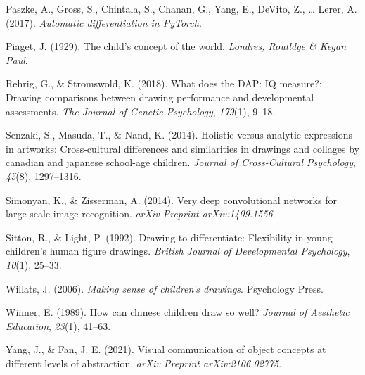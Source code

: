\documentclass[
  man]{apa6}
\newlength{\cslhangindent}
\newlength{\cslentryspacingunit} %
\newenvironment{CSLReferences}[2] %
 {%
  \setlength{\parindent}{0pt}
  \ifodd #1
  \let\oldpar\par
  \def\par{\hangindent=\cslhangindent\oldpar}
  \fi
  \setlength{\parskip}{#2\cslentryspacingunit}
 }%
 {}
\begin{document}
\begin{CSLReferences}{1}{0}
\leavevmode{}%
Paszke, A., Gross, S., Chintala, S., Chanan, G., Yang, E., DeVito, Z., \ldots{} Lerer, A. (2017). \emph{Automatic differentiation in PyTorch}.

\leavevmode{}%
Piaget, J. (1929). The child's concept of the world. \emph{Londres, Routldge \& Kegan Paul}.

\leavevmode{}%
Rehrig, G., \& Stromswold, K. (2018). What does the DAP: IQ measure?: Drawing comparisons between drawing performance and developmental assessments. \emph{The Journal of Genetic Psychology}, \emph{179}(1), 9--18.

\leavevmode{}%
Senzaki, S., Masuda, T., \& Nand, K. (2014). Holistic versus analytic expressions in artworks: Cross-cultural differences and similarities in drawings and collages by canadian and japanese school-age children. \emph{Journal of Cross-Cultural Psychology}, \emph{45}(8), 1297--1316.

\leavevmode{}%
Simonyan, K., \& Zisserman, A. (2014). Very deep convolutional networks for large-scale image recognition. \emph{arXiv Preprint arXiv:1409.1556}.

\leavevmode{}%
Sitton, R., \& Light, P. (1992). Drawing to differentiate: Flexibility in young children's human figure drawings. \emph{British Journal of Developmental Psychology}, \emph{10}(1), 25--33.

\leavevmode{}%
Willats, J. (2006). \emph{Making sense of children's drawings}. Psychology Press.

\leavevmode{}%
Winner, E. (1989). How can chinese children draw so well? \emph{Journal of Aesthetic Education}, \emph{23}(1), 41--63.

\leavevmode{}%
Yang, J., \& Fan, J. E. (2021). Visual communication of object concepts at different levels of abstraction. \emph{arXiv Preprint arXiv:2106.02775}.

\end{CSLReferences}
\end{document}
